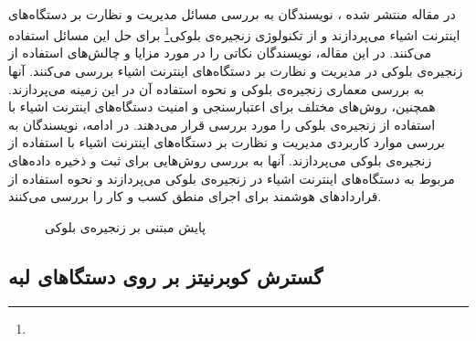 \paragraph{}{
    در مقاله منتشر شده ،
    نویسندگان به بررسی مسائل مدیریت و نظارت بر دستگاه‌های اینترنت اشیاء می‌پردازند
    و از تکنولوژی زنجیره‌ی بلوکی\footnote{} برای حل این مسائل استفاده می‌کنند. 
    در این مقاله، نویسندگان نکاتی را در مورد مزایا و چالش‌های استفاده از زنجیره‌ی بلوکی در مدیریت 
    و نظارت بر دستگاه‌های اینترنت اشیاء بررسی می‌کنند. آنها به بررسی معماری زنجیره‌ی بلوکی و
    نحوه استفاده آن در این زمینه می‌پردازند. همچنین، روش‌های مختلف برای اعتبارسنجی و امنیت 
    دستگاه‌های اینترنت اشیاء با استفاده از زنجیره‌ی بلوکی را مورد بررسی قرار می‌دهند. در ادامه، 
    نویسندگان به بررسی موارد کاربردی مدیریت و نظارت بر دستگاه‌های اینترنت اشیاء با استفاده
    از زنجیره‌ی بلوکی می‌پردازند. آنها به بررسی روش‌هایی برای ثبت و ذخیره داده‌های مربوط به 
    دستگاه‌های اینترنت اشیاء در زنجیره‌ی بلوکی می‌پردازند و نحوه استفاده از قراردادهای هوشمند
    برای اجرای منطق کسب و کار را بررسی می‌کنند.
    \begin{figure}[H]
        \caption{پایش مبتنی بر زنجیره‌ی بلوکی }
        \label{fig:blockchain_monitoring}
    \end{figure}
}

\subsection{
    گسترش کوبرنیتز بر روی دستگا‌های لبه
}
\label{subsec:extending_kubernetes_to_edge}
